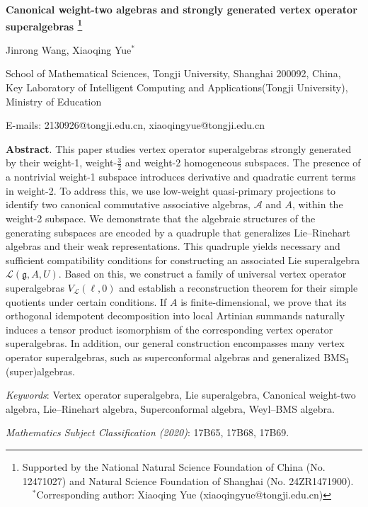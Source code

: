 \documentclass[12pt]{article}
\numberwithin{equation}{section}
\theoremstyle{definition}
\theoremstyle{plain}
\begin{document}
\begin{center}
    \bfseries\large
		Canonical weight-two algebras and strongly generated vertex operator superalgebras
		\footnote{Supported by the National Natural Science Foundation of China (No. 12471027) and Natural Science Foundation of Shanghai (No. 24ZR1471900).
		\\ \indent \ \ $^*$Corresponding author: Xiaoqing Yue (xiaoqingyue@tongji.edu.cn)}
		
		
    \mdseries\normalsize
    \bigskip
		Jinrong Wang, Xiaoqing Yue$^*$
		
    \footnotesize
    \smallskip
		School of Mathematical Sciences, Tongji University, Shanghai 200092, China,\\
        Key Laboratory of Intelligent Computing and  Applications(Tongji University), Ministry of Education
		
    \smallskip
		E-mails: 2130926@tongji.edu.cn, xiaoqingyue@tongji.edu.cn 
\end{center}
    {
    \footnotesize
    \noindent\textbf{Abstract}. This paper studies vertex operator superalgebras strongly generated by their weight-1, weight-$\frac{3}{2}$ and weight-2 homogeneous subspaces. The presence of a nontrivial weight-1 subspace introduces derivative and quadratic current terms in weight-2. To address this, we use low-weight quasi-primary projections to identify two canonical commutative associative algebras, $\mathcal{A}$ and $A$, within the weight-2 subspace. We demonstrate that the algebraic structures of the generating subspaces are encoded by a quadruple that generalizes Lie--Rinehart algebras and their weak representations. This quadruple yields necessary and sufficient compatibility conditions for constructing an associated Lie superalgebra $\mathcal{L}(\mathfrak{g},A,U)$. Based on this, we construct a family of universal vertex operator superalgebras $V_{\mathcal{L}}(\ell,0)$ and establish a reconstruction theorem for their simple quotients under certain conditions. If $A$ is finite-dimensional, we prove that its orthogonal idempotent decomposition into local Artinian summands naturally induces a tensor product isomorphism of the corresponding vertex operator superalgebras. In addition, our general construction encompasses many vertex operator superalgebras, such as superconformal algebras and generalized $\mathrm{BMS}_3$ (super)algebras.
    


    \smallskip
    \noindent\textit{Keywords}: Vertex operator superalgebra, Lie superalgebra, Canonical weight-two algebra, Lie--Rinehart algebra, Superconformal algebra, Weyl--BMS algebra.
    
    \smallskip
    \noindent\textit{Mathematics Subject Classification (2020)}: 17B65, 17B68, 17B69.
    }
\end{document}
